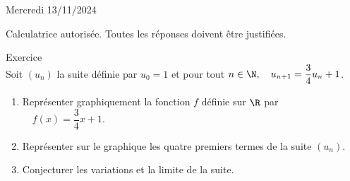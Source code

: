 \documentclass[a4paper,11pt,eval]{nsi}
\newcounter{exoNum}
\newcommand{\exo}[1]
{
	\addtocounter{exoNum}{1}
	{\titlefont\color{UGLiBlue}\Large Exercice\ \theexoNum\ \normalsize{#1}}\smallskip	
}
\begin{document}
\textcolor{UGLiBlue}{Mercredi 13/11/2024}\\
\maketitle
\begin{center}
	Calculatrice autorisée. Toutes les réponses doivent être justifiées.
\end{center}

\vspace*{1cm}

\exo{}\\
Soit $(u_n)$ la suite définie par $u_0=1$ et pour tout $n\in\N, \quad u_{n+1}=\dfrac{3}{4}u_n+1$.
\begin{enumerate}
    
        \item Représenter graphiquement la fonction $f$ définie sur $\R$ par $\quad f(x)=\dfrac{3}{4}x+1$.
        \item Représenter sur le graphique les quatre premiers termes de la suite $(u_n)$.
        \item Conjecturer les variations et la limite de la suite.
    \end{enumerate}
    \begin{center}
        \def\xmin{-3} \def\ymin{-3}\def\xmax{10}\def\ymax{6}
    \end{center}
\end{document}
